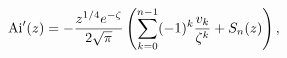 \[\mathop{\mathrm{Ai}\/}\nolimits'\!\left(z\right)=-\frac{z^{1/4}e^{-\zeta}}{2%
\sqrt{\pi}}\left(\sum_{k=0}^{n-1}(-1)^{k}\frac{v_{k}}{\zeta^{k}}+S_{n}(z)%
\right),\]